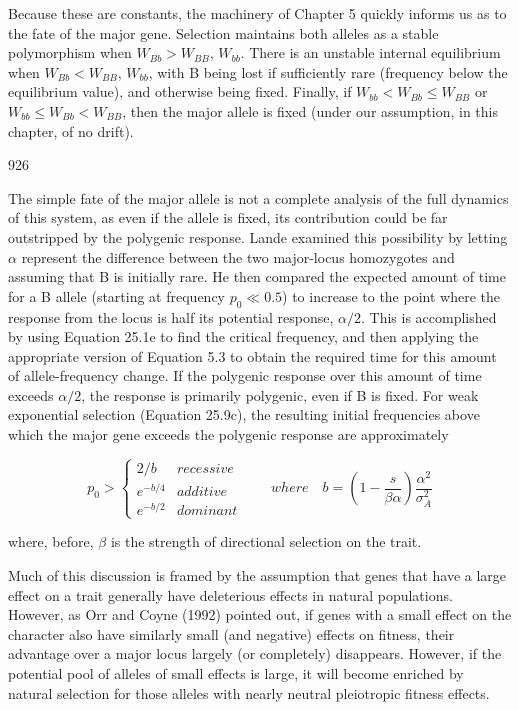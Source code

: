 \documentclass{article}
\begin{document}
Because these are constants, the machinery of Chapter 5 quickly informs us as to the fate of the major gene. Selection maintains both alleles as a stable polymorphism when  $ W_{Bb} > W_{BB} $,  $ W_{bb} $. There is an unstable internal equilibrium when  $ W_{Bb} < W_{BB} $,  $ W_{bb} $, with B being lost if sufficiently rare (frequency below the equilibrium value), and otherwise being fixed. Finally, if  $ W_{bb} < W_{Bb} \leq W_{BB} $ or  $ W_{bb} \leq W_{Bb} < W_{BB} $, then the major allele is fixed (under our assumption, in this chapter, of no drift).

926

The simple fate of the major allele is not a complete analysis of the full dynamics of this system, as even if the allele is fixed, its contribution could be far outstripped by the polygenic response. Lande examined this possibility by letting  $ \alpha $ represent the difference between the two major-locus homozygotes and assuming that B is initially rare. He then compared the expected amount of time for a B allele (starting at frequency  $ p_0 \ll 0.5 $) to increase to the point where the response from the locus is half its potential response,  $ \alpha/2 $. This is accomplished by using Equation 25.1e to find the critical frequency, and then applying the appropriate version of Equation 5.3 to obtain the required time for this amount of allele-frequency change. If the polygenic response over this amount of time exceeds  $ \alpha/2 $, the response is primarily polygenic, even if B is fixed. For weak exponential selection (Equation 25.9c), the resulting initial frequencies above which the major gene exceeds the polygenic response are approximately

\begin{equation}
p_{0}>\begin{cases}2/b&recessive\\e^{-b/4}&additive\\e^{-b/2}&dominant\end{cases}\qquad where\quad b=\left(1-\frac{s}{\beta\alpha}\right)\frac{\alpha^{2}}{\sigma_{A}^{2}}
\tag{25.9d}
\label{eq:25_9d}
\end{equation}

where, before,  $ \beta $ is the strength of directional selection on the trait.

Much of this discussion is framed by the assumption that genes that have a large effect on a trait generally have deleterious effects in natural populations. However, as Orr and Coyne (1992) pointed out, if genes with a small effect on the character also have similarly small (and negative) effects on fitness, their advantage over a major locus largely (or completely) disappears. However, if the potential pool of alleles of small effects is large, it will become enriched by natural selection for those alleles with nearly neutral pleiotropic fitness effects.
\end{document}

